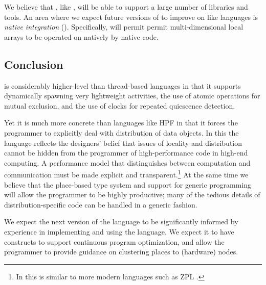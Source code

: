 We believe that \Xten{}, like \java{}, will be able to support a large
number of libraries and tools. An area where we expect future versions
of \Xten{} to improve on \java{} like languages is \emph{native
integration} (). Specifically, \Xten{} will permit
permit multi-dimensional local arrays to be operated on natively by
native code.

\subsection{Conclusion}
{}\Xten{} is considerably higher-level than thread-based languages in
that it supports dynamically spawning very lightweight activities, the
use of atomic operations for mutual exclusion, and the use of clocks
for repeated quiescence detection.

Yet it is much more concrete than languages like HPF in that it forces
the programmer to explicitly deal with distribution of data
objects. In this the language reflects the designers' belief that
issues of locality and distribution cannot be hidden from the
programmer of high-performance code in high-end computing.  A
performance model that distinguishes between computation and
communication must be made explicit and transparent.\footnote{In this
\Xten{} is similar to more modern languages such as ZPL \cite{zpl}.}
At the same time we believe that the place-based type system and
support for generic programming will allow the \Xten{} programmer to
be highly productive; many of the tedious details of
distribution-specific code can be handled in a generic fashion.

We expect the next version of the language to be significantly
informed by experience in implementing and using the language. We
expect it to have constructs to support continuous program
optimization, and allow the programmer to provide guidance on
clustering places to (hardware) nodes. 
